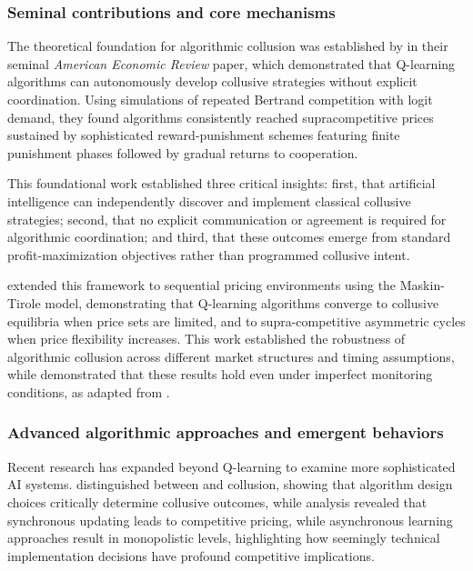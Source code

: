 \subsubsection*{Seminal contributions and core mechanisms}

The theoretical foundation for algorithmic collusion was established by \textcite{calvano_artificial_2020} in their seminal \emph{American Economic Review} paper, which demonstrated that Q-learning algorithms can autonomously develop collusive strategies without explicit coordination. Using simulations of repeated Bertrand competition with logit demand, they found algorithms consistently reached supracompetitive prices sustained by sophisticated reward-punishment schemes featuring finite punishment phases followed by gradual returns to cooperation.

This foundational work established three critical insights: first, that artificial intelligence can independently discover and implement classical collusive strategies; second, that no explicit communication or agreement is required for algorithmic coordination; and third, that these outcomes emerge from standard profit-maximization objectives rather than programmed collusive intent.

\textcite{klein_autonomous_2021} extended this framework to sequential pricing environments using the Maskin-Tirole model, demonstrating that Q-learning algorithms converge to collusive equilibria when price sets are limited, and to supra-competitive asymmetric cycles when price flexibility increases. This work established the robustness of algorithmic collusion across different market structures and timing assumptions, while \textcite{calvano_algorithmic_2021} demonstrated that these results hold even under imperfect monitoring conditions, as adapted from \textcite{green_noncooperative_1984}.

\subsubsection*{Advanced algorithmic approaches and emergent behaviors}

Recent research has expanded beyond Q-learning to examine more sophisticated AI systems. 
\textcite{calvano_algorithmic_2023} distinguished between  and  collusion, showing that algorithm design choices critically determine collusive outcomes, while \textcite{asker_artificial_2022, asker_impact_2024} analysis revealed that synchronous updating leads to competitive pricing, while asynchronous learning approaches result in monopolistic levels, highlighting how seemingly technical implementation decisions have profound competitive implications.

